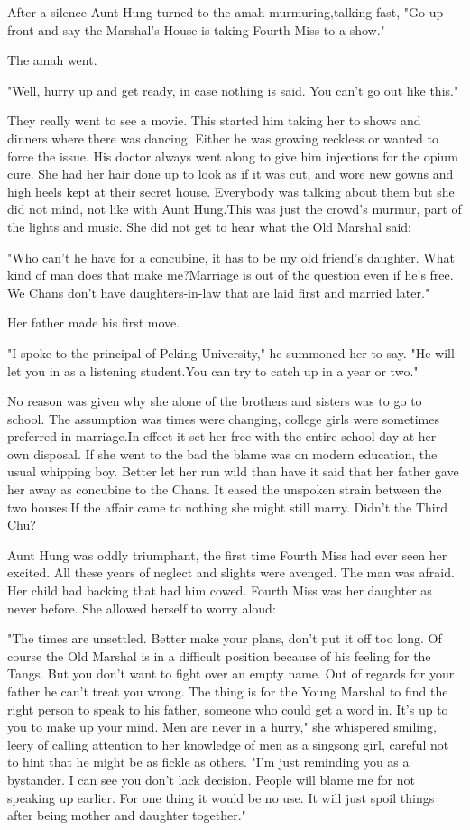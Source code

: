 \par After a silence Aunt Hung turned to the amah murmuring,talking fast, "Go up front and say the Marshal's House is taking Fourth Miss to a show."
\par The amah went.
\par "Well, hurry up and get ready, in case nothing is said. You can't go out like this."
\par They really went to see a movie. This started him taking her to shows and dinners where there was dancing. Either he was growing reckless or wanted to force the issue. His doctor always went along to give him injections for the opium cure. She had her hair done up to look as if it was cut, and wore new gowns and high heels kept at their secret house. Everybody was talking about them but she did not mind, not like with Aunt Hung.This was just the crowd's murmur, part of the lights and music. She did not get to hear what the Old Marshal said:
\par "Who can't he have for a concubine, it has to be my old friend's daughter. What kind of man does that make me?Marriage is out of the question even if he's free. We Chans don't have daughters-in-law that are laid first and married later."
\par Her father made his first move.
\par "I spoke to the principal of Peking University," he summoned her to say. "He will let you in as a listening student.You can try to catch up in a year or two."
\par No reason was given why she alone of the brothers and sisters was to go to school. The assumption was times were changing, college girls were sometimes preferred in marriage.In effect it set her free with the entire school day at her own disposal. If she went to the bad the blame was on modern education, the usual whipping boy. Better let her run wild than have it said that her father gave her away as concubine to the Chans. It eased the unspoken strain between the two houses.If the affair came to nothing she might still marry. Didn't the Third Chu?
\par Aunt Hung was oddly triumphant, the first time Fourth Miss had ever seen her excited. All these years of neglect and slights were avenged. The man was afraid. Her child had backing that had him cowed. Fourth Miss was her daughter as never before. She allowed herself to worry aloud:
\par "The times are unsettled. Better make your plans, don't put it off too long. Of course the Old Marshal is in a difficult position because of his feeling for the Tangs. But you don't want to fight over an empty name. Out of regards for your father he can't treat you wrong. The thing is for the Young Marshal to find the right person to speak to his father, someone who could get a word in. It's up to you to make up your mind. Men are never in a hurry," she whispered smiling, leery of calling attention to her knowledge of men as a singsong girl, careful not to hint that he might be as fickle as others. "I'm just reminding you as a bystander. I can see you don't lack decision. People will blame me for not speaking up earlier. For one thing it would be no use. It will just spoil things after being mother and daughter together."
